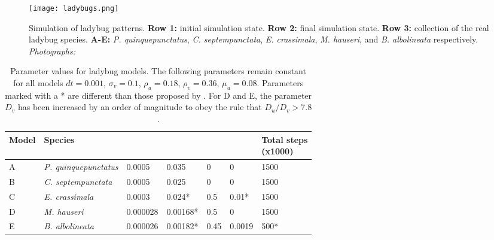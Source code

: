 \begin{figure}[!ht]
	\centering
	\texttt{[image: ladybugs.png]}
	\caption{Simulation of ladybug patterns. \textbf{Row 1:} initial simulation state. \textbf{Row 2:} final simulation state. \textbf{Row 3:} collection of the real ladybug species. \textbf{A-E:} \textit{P. quinquepunctatus}, \textit{C. septempunctata}, \textit{E. crassimala}, \textit{M. hauseri}, and \textit{B. albolineata} respectively. \textit{Photographs: \citep{chen2008}}}
	\label{fig:ladyBugPatterns}
\end{figure}

\begin{table}[p]
	\centering
	\begin{tabular}{lllllll}
	\hline
	\textbf{Model} & \textbf{Species} &\bm{$D_u$} &\bm{$D_v$} &\bm{$\kappa$} & \bm{$\sigma_u$} &\thead{\textbf{Total steps} \\ \textbf{(x1000)}}\\ \hline 
	A     &\textit{P. quinquepunctatus}&0.0005  &0.035    &0        &0          & 1500              \\ 
	B     &\textit{C. septempunctata}  &0.0005  &0.025    &0        &0          & 1500              \\ 
	C     &\textit{E. crassimala}      &0.0003  &0.024*   &0.5      &0.01*      & 1500              \\ 
	D     &\textit{M. hauseri}         &0.000028&0.00168* &0.5      &0          & 1500              \\ 
	E     &\textit{B. albolineata}     &0.000026&0.00182* &0.45     &0.0019     & 500*              \\
	\hline
	\end{tabular}
	\caption {Parameter values for ladybug models. The following parameters remain constant for all models $dt = 0.001$, $\sigma_v= 0.1$, $\rho_u = 0.18$, $\rho_v = 0.36$, $\mu_u = 0.08$. Parameters marked with a * are different than those proposed by \citet{liaw2001}. For D and E, the parameter $D_v$ has been increased by an order of magnitude to obey the rule that $D_u / D_v > 7.8$ \citep{liaw2001}.}
	\label{tab:ladyBugParameters}
\end{table}

